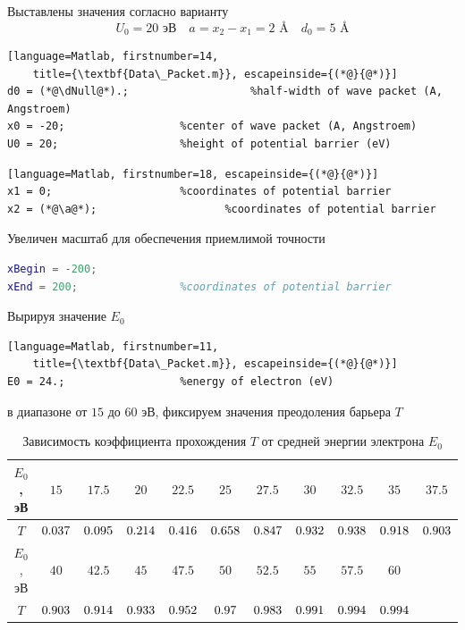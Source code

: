 \documentclass[12pt,a4paper]{article}
\newcommand{\CalcThree}[1]{\fpeval{round((#1),3)}}
\def\a    {2}
\def\dNull{5}
\def\Tone      {0.036915} %
\def\Ttwo      {0.094669} %
\def\Tthree    {0.213770} %
\def\Tfour     {0.416100} %
\def\Tfive     {0.658260} %
\def\Tsix      {0.847300} %
\def\Tseven    {0.931940} %
\def\Teight    {0.938320} %
\def\Tnine     {0.918050} %
\def\Tten      {0.903320} %
\def\Televen   {0.902810} %
\def\Ttwelve   {0.914400} %
\def\Tthirteen {0.932510} %
\def\Tfourteen {0.952190} %
\def\Tfifteen  {0.969540} %
\def\Tsixteen  {0.982620} %
\def\Tseventeen{0.990780} %
\def\Teighteen {0.994210} %
\def\Tnineteen {0.994320} %
\begin{document}
Выставлены значения согласно варианту 
\begin{equation*}
	U_0 = 20\text{ эВ} \quad a = x_2 - x_1 = \a\text{ \AA} \quad d_0 = \dNull\text{ \AA}
\end{equation*}
\begin{lstlisting}[language=Matlab, firstnumber=14, 
	title={\textbf{Data\_Packet.m}}, escapeinside={(*@}{@*)}]
d0 = (*@\dNull@*).;                   %half-width of wave packet (A, Angstroem)
x0 = -20;                  %center of wave packet (A, Angstroem)
U0 = 20;                   %height of potential barrier (eV)
\end{lstlisting}
\begin{lstlisting}[language=Matlab, firstnumber=18, escapeinside={(*@}{@*)}]
x1 = 0;                    %coordinates of potential barrier
x2 = (*@\a@*);                    %coordinates of potential barrier
\end{lstlisting}
Увеличен масштаб для обеспечения приемлимой точности
\begin{lstlisting}[language=Matlab, firstnumber=27, 
	title={\textbf{Data\_Packet.m}}]
% begin and end of line segment of axis 'x'
xBegin = -200;
xEnd = 200;                %coordinates of potential barrier
\end{lstlisting}
Вырируя значение $E_0$ 
\begin{lstlisting}[language=Matlab, firstnumber=11, 
	title={\textbf{Data\_Packet.m}}, escapeinside={(*@}{@*)}]
E0 = 24.;                  %energy of electron (eV)
\end{lstlisting}
в диапазоне от $15$ до $60$ эВ, фиксируем значения преодоления барьера $T$
\begin{table}[H]
	\centering
	\begin{tabularx}{\textwidth}{|C|C|C|C|C|C|C|C|C|C|C|}
		\hline
		$E_0$, эВ & $15$ & $17.5$ & $20$ & $22.5$ & $25$ & $27.5$ & $30$ & $32.5$ & $35$ & $37.5$  \\
		\hline
		$T$ & $\CalcThree{\Tone}$ & $\CalcThree{\Ttwo}$ & $\CalcThree{\Tthree}$ & $\CalcThree{\Tfour}$ & $\CalcThree{\Tfive}$ & $\CalcThree{\Tsix}$ & $\CalcThree{\Tseven}$ & $\CalcThree{\Teight}$ & $\CalcThree{\Tnine}$ & $\CalcThree{\Tten}$ \\
		\hline
		$E_0$, эВ & $40$ & $42.5$ & $45$ & $47.5$ & $50$ & $52.5$ & $55$ & $57.5$ & $60$ &  \\
		$T$ & $\CalcThree{\Televen}$ & $\CalcThree{\Ttwelve}$ & $\CalcThree{\Tthirteen}$ & $\CalcThree{\Tfourteen}$ & $\CalcThree{\Tfifteen}$ & $\CalcThree{\Tsixteen}$ & $\CalcThree{\Tseventeen}$ & $\CalcThree{\Teighteen}$ & $\CalcThree{\Tnineteen}$ &  \\
		\hline
	\end{tabularx}
	\caption{Зависимость коэффициента прохождения $T$ от средней энергии электрона $E_0$}
	\label{tab:transmission}
\end{table}
\end{document}
